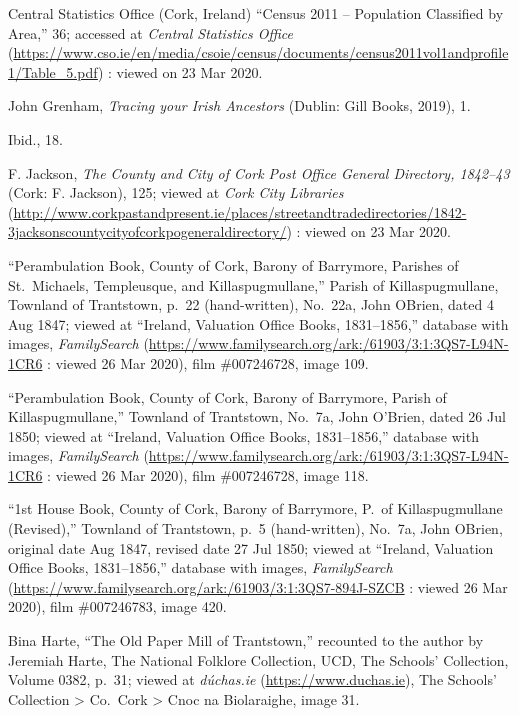 \begin{thebibliography}{999}
	Central Statistics Office (Cork, Ireland) ``Census 2011 -- Population Classified by Area,'' 36; accessed at \textit{Central Statistics Office} (\url{https://www.cso.ie/en/media/csoie/census/documents/census2011vol1andprofile1/Table_5.pdf}) : viewed on 23 Mar 2020.
	
	John Grenham, \textit{Tracing your Irish Ancestors} (Dublin: Gill Books, 2019), 1.
	
	Ibid., 18.
	
	F. Jackson, \textit{The County and City of Cork Post Office General Directory, 1842--43} (Cork: F. Jackson), 125; viewed at \textit{Cork City Libraries} (\url{http://www.corkpastandpresent.ie/places/streetandtradedirectories/1842-3jacksonscountycityofcorkpogeneraldirectory/}) : viewed on 23 Mar 2020.
	
	``Perambulation Book, County of Cork, Barony of Barrymore, Parishes of St.\ Michaels, Templeusque, and Killaspugmullane,'' Parish of Killaspugmullane, Townland of Trantstown, p.\ 22 (hand-written), No.\ 22a, John OBrien, dated 4 Aug 1847; viewed at ``Ireland, Valuation Office Books, 1831--1856,'' database with images, \textit{FamilySearch} (\url{https://www.familysearch.org/ark:/61903/3:1:3QS7-L94N-1CR6} : viewed 26 Mar 2020), film \#007246728, image 109.
	
	``Perambulation Book, County of Cork, Barony of Barrymore, Parish of Killaspugmullane,'' Townland of Trantstown, No.\ 7a, John O'Brien, dated 26 Jul 1850; viewed at ``Ireland, Valuation Office Books, 1831--1856,'' database with images, \textit{FamilySearch} (\url{https://www.familysearch.org/ark:/61903/3:1:3QS7-L94N-1CR6} : viewed 26 Mar 2020), film \#007246728, image 118.
	
	``1st House Book, County of Cork, Barony of Barrymore, P.\ of Killaspugmullane (Revised),'' Townland of Trantstown, p.\ 5 (hand-written), No.\ 7a, John OBrien, original date Aug 1847, revised date 27 Jul 1850; viewed at ``Ireland, Valuation Office Books, 1831--1856,'' database with images, \textit{FamilySearch} (\url{https://www.familysearch.org/ark:/61903/3:1:3QS7-894J-SZCB} : viewed 26 Mar 2020), film \#007246783, image 420.
		
	Bina Harte, ``The Old Paper Mill of Trantstown,'' recounted to the author by Jeremiah Harte, The National Folklore Collection, UCD, The Schools' Collection, Volume 0382, p.\ 31; viewed at \textit{d\'{u}chas.ie} (\url{https://www.duchas.ie}), The Schools' Collection > Co.\ Cork > Cnoc na Biolaraighe, image 31.
	

\end{thebibliography}
